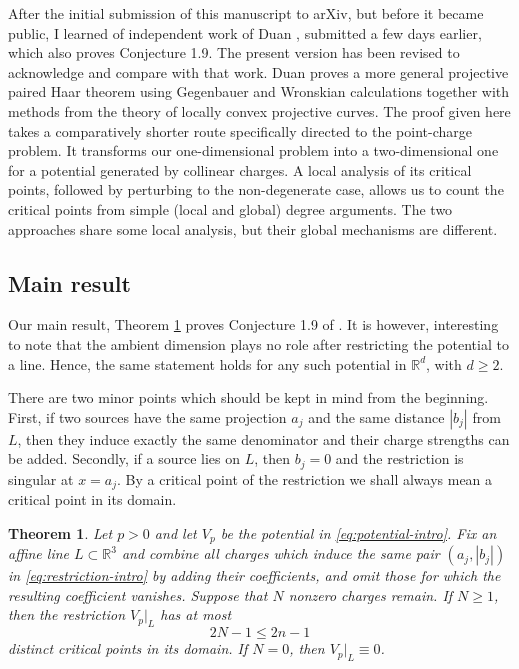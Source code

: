 \documentclass[leqno,11pt]{amsart}
\numberwithin{equation}{section}
\newcommand{\bbR}{\mathbb{R}}
\newtheorem{theorem}{Theorem}
\theoremstyle{definition}
\begin{document}
	After the initial submission of this manuscript to arXiv, but before it became public, I learned of independent work of Duan \cite{Duan}, submitted a few days earlier, which also proves Conjecture 1.9. The present version has been revised to acknowledge and compare with that work.
	Duan proves a more general projective paired Haar theorem using Gegenbauer and Wronskian calculations together with methods from the theory of locally convex projective curves. The proof given here takes a comparatively shorter route specifically directed to the point-charge problem. It transforms our one-dimensional problem into a two-dimensional one for a potential generated by collinear charges. A local analysis of its critical points, followed by perturbing to the non-degenerate case, allows us to count the critical points from simple (local and global) degree arguments. The two approaches share some local analysis, but their global mechanisms are different.
	

	\subsection{Main result}
	
	Our main result, Theorem \ref{thm:main} proves Conjecture 1.9 of \cite{GNS}. It is however, interesting to note that the ambient dimension plays no role after restricting the potential to a line. Hence, the same statement holds for any such potential in $\bbR^d$, with $d\geq2$.
	
	There are two minor points which should be kept in mind from the beginning. First, if two sources have the same projection $a_j$ and the same distance $|b_j|$ from $L$, then they induce exactly the same denominator and their charge strengths can be added. Secondly, if a source lies on $L$, then $b_j=0$ and the restriction is singular at $x=a_j$. By a critical point of the restriction we shall always mean a critical point in its domain.
	
	\begin{theorem}\label{thm:main}
		Let $p>0$ and let $V_p$ be the potential in \eqref{eq:potential-intro}. Fix an affine line $L\subset\bbR^3$ and combine all charges which induce the same pair $(a_j,|b_j|)$ in \eqref{eq:restriction-intro} by adding their coefficients, and omit those for which the resulting coefficient vanishes. Suppose that $N$ nonzero charges remain. If $N\geq1$, then the restriction $V_p|_L$ has at most
		\[
		2N-1\leq 2n-1
		\]
		distinct critical points in its domain. If $N=0$, then $V_p|_L\equiv0$.
	\end{theorem}
	
\end{document}
